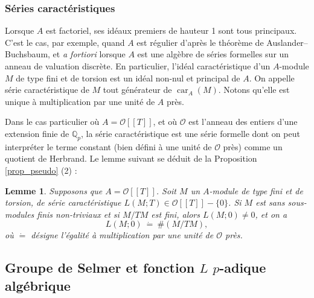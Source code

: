 \documentclass[12pt]{amsart}
\newcommand\Qp{\mathbb{Q}_{p}}
\newcommand\cO{\mathcal{O}}
\DeclareMathOperator{\car}{car}
\theoremstyle{defstyle}
\theoremstyle{thmstyle}
\newtheorem{lemme}[subsubsection]{Lemme}
\begin{document}
\subsubsection{Séries caractéristiques}
Lorsque $A$ est factoriel, ses idéaux premiers de hauteur 1 sont tous principaux. C'est le cas, par exemple, quand $A$ est régulier d'après le théorème de Auslander--Buchsbaum, et \textit{a fortiori} lorsque $A$ est une algèbre de séries formelles sur un anneau de valuation discrète. En particulier, l'idéal caractéristique d'un $A$-module $M$ de type fini et de torsion est un idéal non-nul et principal de $A$. On appelle série caractéristique de $M$ tout générateur de $\car_A(M)$. Notons qu'elle est unique à multiplication par une unité de $A$ près.

Dans le cas particulier où $A={\cO}[[T]]$, et où ${\cO}$ est l'anneau des entiers d'une extension finie de $\Qp$, la série caractéristique est une série formelle dont on peut interpréter le terme constant (bien défini à une unité de $\cO$ près) comme un quotient de Herbrand. Le lemme suivant se déduit de la Proposition \ref{prop_pseudo} (2) :

\begin{lemme}\label{cst}
	Supposons que $A={\cO}[[T]]$. Soit $M$ un $A$-module de type fini et de torsion, de série caractéristique $L(M;T)\in \cO[[T]]-\{0\}$. Si $M$ est sans sous-modules finis non-triviaux et si $M/TM$ est fini, alors $L(M;0)\neq 0$, et on a 
	$$L(M;0)\ \dot{=}\ \#(M/TM),$$
	où $\dot{=}$ désigne l'égalité à multiplication par une unité de ${\cO}$ près.
\end{lemme}

\subsection{Groupe de Selmer et fonction $L$ $p$-adique algébrique}
\end{document}
